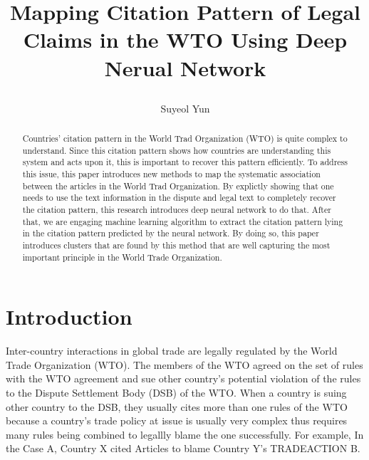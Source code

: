 \documentclass[12pt,letterpaper]{article}
\newcommand{\tit}{
\bf 
Mapping Citation Pattern of Legal Claims in the WTO Using Deep Nerual Network
}
\newcommand\spacingset[1]{\renewcommand{\baselinestretch}
{#1}\small\normalsize}
\begin{document}
\spacingset{1.25}

\setcounter{page}{0}
\vspace{-.1in}

{\title{
    \tit
  }
  \author{Suyeol Yun
  }
  \maketitle
}

\thispagestyle{empty}
\vspace{-.1in}

\begin{abstract}

  Countries' citation pattern in the World Trad Organization (WTO) is quite complex to understand.
  Since this citation pattern shows how countries are understanding this system and acts upon it,
  this is important to recover this pattern efficiently. To address this issue, this paper introduces new methods to map the systematic association between the articles in the World Trad Organization.
  By explictly showing that one needs to use the text information in the dispute and legal text to completely recover the citation pattern,
  this research introduces deep neural network to do that.
  After that, we are engaging machine learning algorithm to extract the citation pattern lying in the citation pattern predicted by the neural network. By doing so, this paper introduces clusters that are found by this method that are well capturing the most important principle in the World Trade Organization.

\end{abstract}

\spacingset{1.5} %

\section{Introduction}

Inter-country interactions in global trade are legally regulated by the World Trade Organization (WTO).
The members of the WTO agreed on the set of rules with the WTO agreement and sue other country's potential
violation of the rules to the Dispute Settlement Body (DSB) of the WTO.
When a country is suing other country to the DSB, they usually cites more than one rules of the WTO
because a country's trade policy at issue is usually very complex thus requires many rules being combined to legallly blame the one successfully.
For example, In the Case A, Country X cited {Articles} to blame Country Y's TRADEACTION B.
\end{document}
